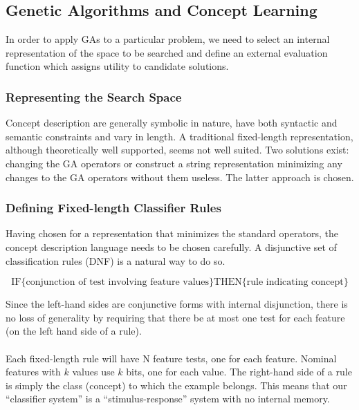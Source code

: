 \documentclass[../main.tex]{subfiles}
\begin{document}
\subsection{Genetic Algorithms and Concept Learning}
In order to apply GAs to a particular problem, we need to select an internal representation of the space to be searched
and define an external evaluation function which assigns utility to candidate solutions.

\subsubsection{Representing the Search Space}

Concept description are generally symbolic in nature, have both syntactic and semantic constraints and vary in length.
A traditional fixed-length representation, although theoretically well supported, seems not well suited. Two solutions
exist: changing the GA operators or construct a string representation minimizing any changes to the GA operators
without them useless. The latter approach is chosen.

\subsubsection{Defining Fixed-length Classifier Rules}

Having chosen for a representation that minimizes the standard operators, the concept description language needs to be chosen carefully. A disjunctive set of classification rules (DNF) is a natural way to do so.

\[
\text{IF} \{ \text{conjunction of test involving feature values} \} \text{THEN} \{ \text{rule indicating concept} \}
\]

Since the left-hand sides are conjunctive forms with internal disjunction, there is no loss of generality by requiring
that there be at most one test for each feature (on the left hand side of a rule).
\\\\
Each fixed-length rule will have N feature tests, one for each feature. Nominal features with $k$ values use $k$ bits,
one for each value. The right-hand side of a rule is simply the class (concept) to which the example belongs. This
means that our ``classifier system'' is a ``stimulus-response'' system with no internal memory.
\end{document}
